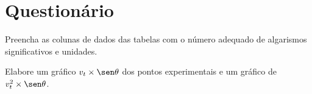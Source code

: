 \cleardoublepage


\vspace{15mm}

\begin{fullwidth}
\noindent{}
\vspace{5mm}

\noindent{}

\noindent{}

\noindent{}

\noindent{}

\noindent{}
\end{fullwidth}

\vspace{5mm}

\section{Questionário}

\begin{question}[type={exam}]
Preencha as colunas de dados das tabelas com o número adequado de algarismos significativos e unidades.
\end{question}


\begin{question}[type={exam}]
Elabore um gráfico $v_t \times \sen\theta$ dos pontos experimentais e um gráfico de $v_t^2 \times \sen\theta$.
\end{question}

